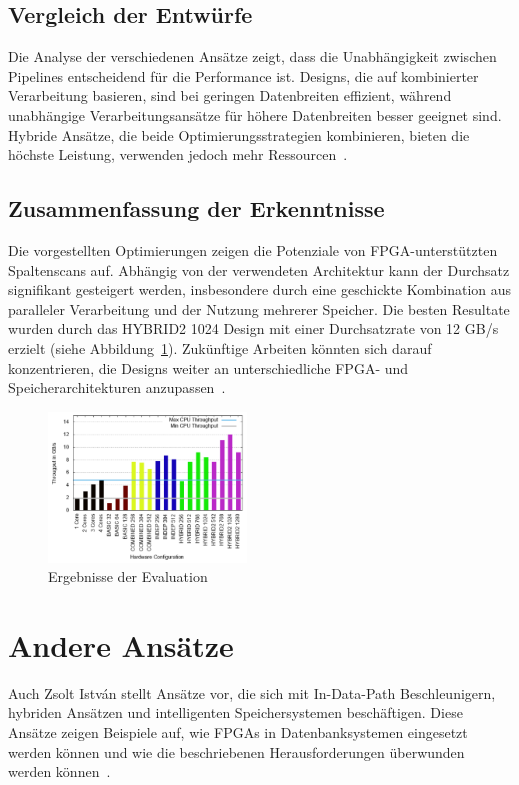 \documentclass[conference]{IEEEtran}
\begin{document}
\subsection{Vergleich der Entwürfe}

Die Analyse der verschiedenen Ansätze zeigt, dass die Unabhängigkeit zwischen Pipelines entscheidend für die Performance ist. Designs,
die auf kombinierter Verarbeitung basieren, sind bei geringen Datenbreiten effizient, während unabhängige Verarbeitungsansätze für
höhere Datenbreiten besser geeignet sind. Hybride Ansätze, die beide Optimierungsstrategien kombinieren, bieten die höchste Leistung,
verwenden jedoch mehr Ressourcen~\cite{lisa_column_2018}.

\subsection{Zusammenfassung der Erkenntnisse}

Die vorgestellten Optimierungen zeigen die Potenziale von FPGA-unterstützten Spaltenscans auf. Abhängig von der verwendeten Architektur kann
der Durchsatz signifikant gesteigert werden, insbesondere durch eine geschickte Kombination aus paralleler Verarbeitung und der Nutzung mehrerer
Speicher. Die besten Resultate wurden durch das HYBRID2 1024 Design mit einer Durchsatzrate von 12 GB/s erzielt (siehe Abbildung~\ref{fig:eval}). Zukünftige Arbeiten
könnten sich darauf konzentrieren, die Designs weiter an unterschiedliche FPGA- und Speicherarchitekturen anzupassen~\cite{lisa_column_2018}.


\begin{figure}[htbp]

    \includegraphics[width=0.47\textwidth]{imgs/eval.png}
    \caption{Ergebnisse der Evaluation~\cite{lisa_column_2018}}
    \label{fig:eval}
\end{figure}


\section{Andere Ansätze} \label{sec:andere_ansätze}
Auch Zsolt Istv\'{a}n stellt Ansätze vor, die sich mit In-Data-Path Beschleunigern, hybriden Ansätzen und intelligenten Speichersystemen beschäftigen. Diese Ansätze
zeigen Beispiele auf, wie FPGAs in Datenbanksystemen eingesetzt werden können und wie die beschriebenen Herausforderungen überwunden werden können~\cite{istvan_glass_2019}.
\end{document}
